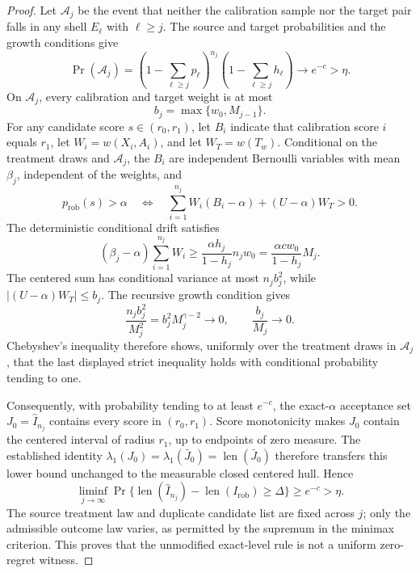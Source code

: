 \documentclass{article}
\begin{document}
\begin{proof}
Let \(\mathcal A_j\) be the event that neither the calibration sample nor the target pair falls in any shell \(E_\ell\) with \(\ell\ge j\). The source and target probabilities and the growth conditions give
\[
\Pr(\mathcal A_j)
 =\left(1-\sum_{\ell\ge j}p_\ell\right)^{n_j}
  \left(1-\sum_{\ell\ge j}h_\ell\right)
 \longrightarrow e^{-c}>\eta.
\]
On \(\mathcal A_j\), every calibration and target weight is at most
\[
b_j=\max\{w_0,M_{j-1}\}.
\]
For any candidate score \(s\in(r_0,r_1)\), let \(B_i\) indicate that calibration score \(i\) equals \(r_1\), let \(W_i=w(X_i,A_i)\), and let \(W_T=w(T_w)\). Conditional on the treatment draws and \(\mathcal A_j\), the \(B_i\) are independent Bernoulli variables with mean \(\beta_j\), independent of the weights, and
\[
p_{\mathrm{rob}}(s)>\alpha
\quad\Longleftrightarrow\quad
\sum_{i=1}^{n_j}W_i(B_i-\alpha)
 +(U-\alpha)W_T>0.
\]
The deterministic conditional drift satisfies
\[
(\beta_j-\alpha)\sum_{i=1}^{n_j}W_i
 \ge\frac{\alpha h_j}{1-h_j}n_jw_0
 =\frac{\alpha c w_0}{1-h_j}M_j.
\]
The centered sum has conditional variance at most \(n_jb_j^2\), while \(|(U-\alpha)W_T|\le b_j\). The recursive growth condition gives
\[
\frac{n_jb_j^2}{M_j^2}
 =b_j^2M_j^{\gamma-2}\longrightarrow0,
\qquad
\frac{b_j}{M_j}\longrightarrow0.
\]
Chebyshev's inequality therefore shows, uniformly over the treatment draws in \(\mathcal A_j\), that the last displayed strict inequality holds with conditional probability tending to one.

Consequently, with probability tending to at least \(e^{-c}\), the exact-\(\alpha\) acceptance set \(J_0=\widehat I_{n_j}\) contains every score in \((r_0,r_1)\). Score monotonicity makes \(J_0\) contain the centered interval of radius \(r_1\), up to endpoints of zero measure. The established identity \(\lambda_1(J_0)=\lambda_1(\bar J_0)=\operatorname{len}(\bar J_0)\) therefore transfers this lower bound unchanged to the measurable closed centered hull. Hence
\[
\liminf_{j\to\infty}
\Pr\{\operatorname{len}(\widehat I_{n_j})
-\operatorname{len}(I_{\mathrm{rob}})\ge\Delta\}
\ge e^{-c}>\eta.
\]
The source treatment law and duplicate candidate list are fixed across \(j\); only the admissible outcome law varies, as permitted by the supremum in the minimax criterion. This proves that the unmodified exact-level rule is not a uniform zero-regret witness.
\end{proof}
\end{document}
